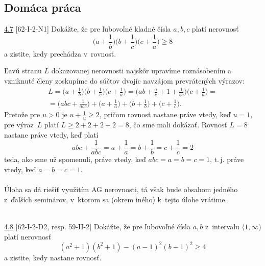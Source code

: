 \subsection*{Domáca práca}
\begin{tcolorbox}[breakable,notitle,boxrule=0pt,colback=light-gray,colframe=light-gray]\ul{4.7} [62-I-2-N1]
Dokážte, že pre ľubovoľné kladné čísla $a, b, c$ platí nerovnosť
$$\bigg(a +\frac{1}{b}\bigg)\bigg(b+\frac{1}{c}\bigg)\bigg(c+\frac{1}{a}\bigg)\geq 8$$
a zistite, kedy prechádza v~rovnosť.

\end{tcolorbox}

\rieh Ľavú stranu $L$ dokazovanej nerovnosti najskôr upravíme roznásobením a vzniknuté členy zoskupíme do súčtov dvojíc navzájom prevrátených výrazov:
\begin{multline*} L = \bigg(a +\frac{1}{b}\bigg)\bigg(b+\frac{1}{c}\bigg)\bigg(c+\frac{1}{a}\bigg) = \bigg(ab+ \frac{a}{c} + 1 +\frac{1}{bc}\bigg) \bigg(c +\frac{1}{a}\bigg)=\\ =\bigg( abc + \frac{1}{abc}\bigg)+\bigg( a+\frac{1}{a}\bigg)+ \bigg(b+\frac{1}{b}\bigg)+\bigg(c+\frac{1}{c}\bigg).\end{multline*}
Pretože pre $u > 0$ je $u+\frac{1}{u}\geq 2$, pričom rovnosť nastane práve vtedy, keď $u = 1$, pre výraz~$L$ platí $L \geq 2 + 2 + 2 + 2 = 8$, čo sme mali dokázať. Rovnosť $L = 8$ nastane práve vtedy, keď platí
$$ abc+\frac{1}{abc}=a+\frac{1}{a}=b+\frac{1}{b}=c+\frac{1}{c}=2$$
teda, ako sme už spomenuli, práve vtedy, keď $abc = a = b = c = 1$,  t.\,j. práve vtedy, keď $a = b = c = 1$.\\
\\
\kom Úloha sa dá riešiť využitím AG nerovnosti, tá však bude obsahom jedného z~ďalších seminárov, v~ktorom sa (okrem iného) k~tejto úlohe vrátime.\\
\\
\begin{tcolorbox}[breakable,notitle,boxrule=0pt,colback=light-gray,colframe=light-gray]\ul{4.8} [62-I-2-D2, resp. 59-II-2]
Dokážte, že pre ľubovoľné čísla $a, b$ z~intervalu $\langle 1, \infty)$ platí nerovnosť
$$ (a^2 + 1)(b^2 + 1) - (a - 1)^2 (b - 1)^2 \geq 4$$
a zistite, kedy nastane rovnosť.

\end{tcolorbox}

